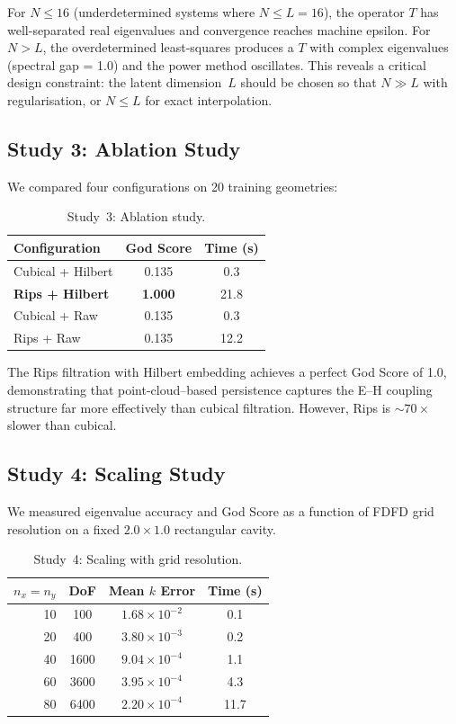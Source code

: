 \documentclass[11pt,twocolumn]{article}
\begin{document}
For $N \leq 16$ (underdetermined systems where
$N \leq L = 16$), the operator $T$ has well-separated real eigenvalues
and convergence reaches machine epsilon.  For $N > L$, the
overdetermined least-squares produces a $T$ with complex eigenvalues
(spectral gap = 1.0) and the power method oscillates.  This reveals
a critical design constraint: the latent dimension~$L$ should be chosen
so that $N \gg L$ with regularisation, or $N \leq L$ for exact
interpolation.

\subsection{Study 3: Ablation Study}

We compared four configurations on 20 training geometries:

\begin{table}[h]
\centering
\caption{Study~3: Ablation study.}
\label{tab:ablation}
\begin{tabular}{lcc}
\toprule
\textbf{Configuration} & \textbf{God Score} & \textbf{Time (s)} \\
\midrule
Cubical + Hilbert & 0.135 & 0.3 \\
\textbf{Rips + Hilbert} & \textbf{1.000} & 21.8 \\
Cubical + Raw & 0.135 & 0.3 \\
Rips + Raw & 0.135 & 12.2 \\
\bottomrule
\end{tabular}
\end{table}

The Rips filtration with Hilbert embedding achieves a perfect God Score
of 1.0, demonstrating that point-cloud--based persistence captures the
E--H coupling structure far more effectively than cubical filtration.
However, Rips is $\sim70\times$ slower than cubical.

\subsection{Study 4: Scaling Study}

We measured eigenvalue accuracy and God Score as a function of FDFD grid
resolution on a fixed $2.0 \times 1.0$ rectangular cavity.

\begin{table}[h]
\centering
\caption{Study~4: Scaling with grid resolution.}
\label{tab:scaling}
\begin{tabular}{rccc}
\toprule
$n_x = n_y$ & DoF & Mean $k$ Error & Time (s) \\
\midrule
10  & 100   & $1.68 \times 10^{-2}$ & 0.1 \\
20  & 400   & $3.80 \times 10^{-3}$ & 0.2 \\
40  & 1600  & $9.04 \times 10^{-4}$ & 1.1 \\
60  & 3600  & $3.95 \times 10^{-4}$ & 4.3 \\
80  & 6400  & $2.20 \times 10^{-4}$ & 11.7 \\
\bottomrule
\end{tabular}
\end{table}
\end{document}
